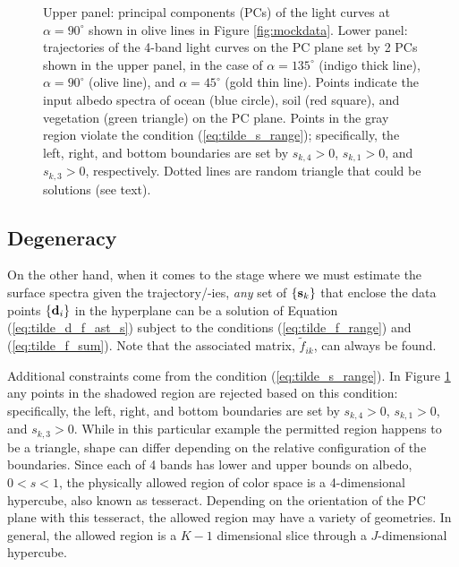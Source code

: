 \documentclass[iop,numberedappendix,apj]{emulateapj}
\def\fast{\tilde f}
\begin{document}
\begin{figure}[t]
\begin{center}
    \end{center}
    \caption{Upper panel: principal components (PCs) of the light curves at $\alpha = 90^{\circ }$ shown in olive lines in Figure \ref{fig:mockdata}. Lower panel: trajectories of the 4-band light curves on the PC plane set by 2 PCs shown in the upper panel, in the case of $\alpha = 135^{\circ }$ (indigo thick line), $\alpha = 90^{\circ }$ (olive line), and $\alpha = 45^{\circ }$ (gold thin line). Points indicate the input albedo spectra of ocean (blue circle), soil (red square), and vegetation (green triangle) on the PC plane. Points in the gray region violate the condition (\ref{eq:tilde_s_range}); specifically, the left, right, and bottom boundaries are set by $s_{k,4} > 0$, $s_{k,1} > 0$, and $s_{k,3}> 0$, respectively. 
Dotted lines are random triangle that could be solutions (see text). }
    \label{fig:trajectory}
\end{figure}

\subsection{Degeneracy}
\label{ss:degeneracy}

On the other hand, when it comes to the stage where we must estimate the surface spectra given the trajectory/-ies, {\it any} set of $\{ {\bf s}_k \}$ that enclose the data points $\{{\bf d}_i\}$ in the hyperplane can be a solution of Equation (\ref{eq:tilde_d_f_ast_s}) subject to the conditions (\ref{eq:tilde_f_range}) and (\ref{eq:tilde_f_sum}). 
Note that the associated matrix, $\fast _{ik}$, can always be found. 

Additional constraints come from the condition (\ref{eq:tilde_s_range}). 
In Figure \ref{fig:trajectory} any points in the shadowed region are rejected based on this condition: specifically, the left, right, and bottom boundaries are set by $s_{k,4}> 0$, $s_{k,1}> 0$, and $s_{k,3}> 0$. 
While in this particular example the permitted region happens to be a triangle, shape can differ depending on the relative configuration of the boundaries. 
Since each of 4 bands has lower and upper bounds on albedo, $0<s<1$, the physically allowed region of color space is a 4-dimensional hypercube, also known as tesseract. Depending on the orientation of the PC plane with this tesseract, the allowed region may have a variety of geometries. 
In general, the allowed region is a $K-1$ dimensional slice through a $J$-dimensional hypercube. 
\end{document}
